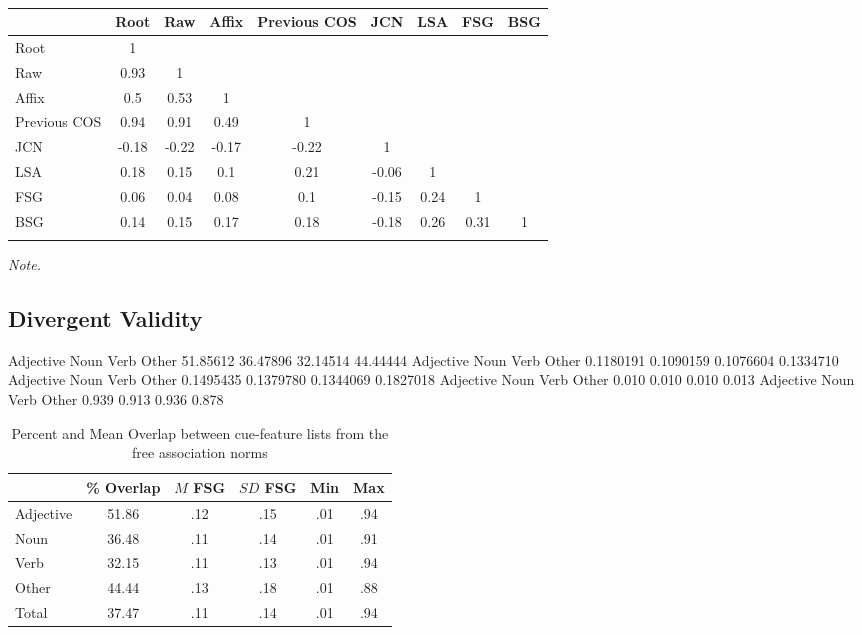 \documentclass[english,man]{apa6}
\theoremstyle{definition}
\theoremstyle{definition}
\theoremstyle{definition}
\theoremstyle{remark}
\begin{document}
\begin{table}[tbp]
\begin{center}
\begin{threeparttable}
\caption{\label{tab:correlation-table}}
\begin{tabular}{lcccccccc}
\toprule
  & Root & Raw & Affix & Previous COS & JCN & LSA & FSG & BSG\\
\midrule
Root & 1 &  &  &  &  &  &  & \\
Raw & 0.93 & 1 &  &  &  &  &  & \\
Affix & 0.5 & 0.53 & 1 &  &  &  &  & \\
Previous COS & 0.94 & 0.91 & 0.49 & 1 &  &  &  & \\
JCN & -0.18 & -0.22 & -0.17 & -0.22 & 1 &  &  & \\
LSA & 0.18 & 0.15 & 0.1 & 0.21 & -0.06 & 1 &  & \\
FSG & 0.06 & 0.04 & 0.08 & 0.1 & -0.15 & 0.24 & 1 & \\
BSG & 0.14 & 0.15 & 0.17 & 0.18 & -0.18 & 0.26 & 0.31 & 1\\
\bottomrule
\addlinespace
\end{tabular}
\begin{tablenotes}[para]
\textit{Note.} 
\end{tablenotes}
\end{threeparttable}
\end{center}
\end{table}

\subsection{Divergent Validity}\label{divergent-validity}

Adjective Noun Verb Other 51.85612 36.47896 32.14514 44.44444 Adjective
Noun Verb Other 0.1180191 0.1090159 0.1076604 0.1334710 Adjective Noun
Verb Other 0.1495435 0.1379780 0.1344069 0.1827018 Adjective Noun Verb
Other 0.010 0.010 0.010 0.013 Adjective Noun Verb Other 0.939 0.913
0.936 0.878

\begin{table}[tbp]
\begin{center}
\begin{threeparttable}
\caption{\label{tab:divergent-table}Percent and Mean Overlap between cue-feature lists from the free association norms}
\begin{tabular}{lccccc}
\toprule
  & \% Overlap & $M$ FSG & $SD$ FSG & Min & Max\\
\midrule
Adjective & 51.86 & .12 & .15 & .01 & .94\\
Noun & 36.48 & .11 & .14 & .01 & .91\\
Verb & 32.15 & .11 & .13 & .01 & .94\\
Other & 44.44 & .13 & .18 & .01 & .88\\
Total & 37.47 & .11 & .14 & .01 & .94\\
\bottomrule
\end{tabular}
\end{threeparttable}
\end{center}
\end{table}
\end{document}
